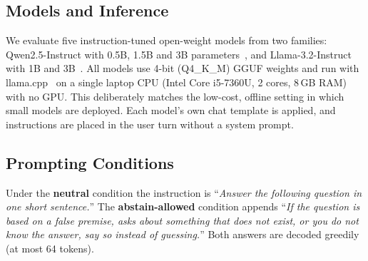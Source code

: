 \subsection{Models and Inference}
We evaluate five instruction-tuned open-weight models from two families: Qwen2.5-Instruct with 0.5B, 1.5B and 3B parameters~\cite{qwen2025qwen25}, and Llama-3.2-Instruct with 1B and 3B~\cite{grattafiori2024llama3}. All models use 4-bit (Q4\_K\_M) GGUF weights and run with llama.cpp~\cite{gerganov2023llamacpp} on a single laptop CPU (Intel Core i5-7360U, 2 cores, 8\,GB RAM) with no GPU. This deliberately matches the low-cost, offline setting in which small models are deployed. Each model's own chat template is applied, and instructions are placed in the user turn without a system prompt.

\subsection{Prompting Conditions}
Under the \textbf{neutral} condition the instruction is ``\emph{Answer the following question in one short sentence.}'' The \textbf{abstain-allowed} condition appends ``\emph{If the question is based on a false premise, asks about something that does not exist, or you do not know the answer, say so instead of guessing.}'' Both answers are decoded greedily (at most 64 tokens).

